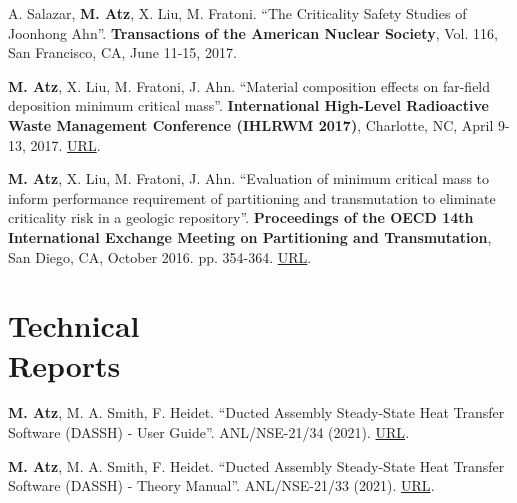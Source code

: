 \documentclass[margin,line]{resume}
\begin{document}
\begin{resume}
\begin{bibenum}
    \item A. Salazar, \textbf{M. Atz}, X. Liu, M. Fratoni. ``The Criticality Safety Studies of Joonhong Ahn''. \textbf{Transactions of the American Nuclear Society}, Vol. 116, San Francisco, CA, June 11-15, 2017.

    \item \textbf{M. Atz}, X. Liu, M. Fratoni, J. Ahn. ``Material composition effects on far-field deposition minimum critical mass''. \textbf{International High-Level Radioactive Waste Management Conference (IHLRWM 2017)}, Charlotte, NC, April 9-13, 2017. \href{https://www.researchgate.net/profile/Milos-Atz/publication/328150158_Material_composition_effects_on_far-field_deposition_minimum_critical_mass/links/5bbbd7bf299bf1049b75d9bf/Material-composition-effects-on-far-field-deposition-minimum-critical-mass.pdf}{URL}.

    \item \textbf{M. Atz}, X. Liu, M. Fratoni, J. Ahn. ``Evaluation of minimum critical mass to inform performance requirement of partitioning and transmutation to eliminate criticality risk in a geologic repository''. \textbf{Proceedings of the OECD 14th International Exchange Meeting on Partitioning and Transmutation}, San Diego, CA, October 2016. pp. 354-364. \href{https://www.oecd-nea.org/science/docs/2017/nsc-r2017-3.pdf}{URL}.

\end{bibenum}
\section{\mysidestyle Technical\\Reports}

\begin{bibenum}

    \item \textbf{M. Atz}, M. A. Smith, F. Heidet. ``Ducted Assembly Steady-State Heat Transfer Software (DASSH) - User Guide''. ANL/NSE-21/34 (2021). \href{https://www.osti.gov/biblio/1812216-ducted-assembly-steady-state-heat-transfer-software-dassh-user-guide}{URL}.

    \item \textbf{M. Atz}, M. A. Smith, F. Heidet. ``Ducted Assembly Steady-State Heat Transfer Software (DASSH) - Theory Manual''. ANL/NSE-21/33 (2021). \href{https://www.osti.gov/biblio/1813446-ducted-assembly-steady-state-heat-transfer-software-dassh-theory-manual}{URL}.
    

\end{bibenum}
\end{resume}
\end{document}
